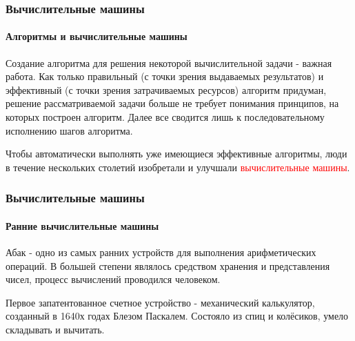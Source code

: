 \documentclass[aspectratio=169]{beamer}
\begin{document}
\begin{frame}
\frametitle{Вычислительные машины}
\framesubtitle{Алгоритмы и вычислительные машины}

Создание алгоритма для решения некоторой вычислительной задачи - важная работа. \newline \newline Как только правильный (с точки зрения выдаваемых результатов) и эффективный (с точки зрения затрачиваемых ресурсов) алгоритм придуман, решение рассматриваемой задачи больше не требует понимания принципов, на которых построен алгоритм. Далее все сводится лишь к последовательному исполнению шагов алгоритма.\newline

Чтобы автоматически выполнять уже имеющиеся эффективные алгоритмы, люди в течение нескольких столетий изобретали и улучшали \textcolor{red}{вычислительные машины}.


\end{frame}

\begin{frame}
\frametitle{Вычислительные машины}
\framesubtitle{Ранние вычислительные машины}
\justifying
Абак - одно из самых ранних устройств для выполнения арифметических операций. В большей степени являлось средством хранения и представления чисел, процесс вычислений проводился человеком. \newline

Первое запатентованное счетное устройство - механический калькулятор, созданный в 1640х годах Блезом Паскалем.
Состояло из спиц и колёсиков, умело складывать и вычитать.

\begin{figure}

    \captionsetup[subfigure]{labelformat=empty}
    \centering
\end{figure}

\end{frame}
\end{document}
